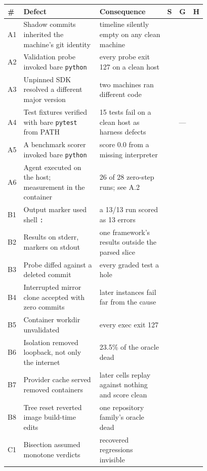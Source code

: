 \documentclass{article}
\newcommand{\cmark}{\ding{51}}
\newcommand{\xmark}{\ding{55}}
\begin{document}
\begin{center}\footnotesize\setlength{\tabcolsep}{4pt}\begin{tabular}{lp{0.42\linewidth}p{0.36\linewidth}ccc}
\toprule
\# & Defect & Consequence & S & G & H \\
\midrule
A1 & Shadow commits inherited the machine's git identity & timeline silently empty on any clean machine & \cmark{} & \cmark{} & \cmark{} \\
A2 & Validation probe invoked bare \texttt{python} & every probe exit 127 on a clean host & \xmark{} & \cmark{} & \cmark{} \\
A3 & Unpinned SDK resolved a different major version & two machines ran different code & \xmark{} & \cmark{} & \cmark{} \\
A4 & Test fixtures verified with bare \texttt{pytest} from PATH & 15 tests fail on a clean host as harness defects & \xmark{} & --- & \cmark{} \\
A5 & A benchmark scorer invoked bare \texttt{python} & score 0.0 from a missing interpreter & \cmark{} & \cmark{} & \cmark{} \\
A6 & Agent executed on the host; measurement in the container & 26 of 28 zero-step runs; see A.2 & \cmark{} & \cmark{} & \cmark{} \\
B1 & Output marker used shell \texttt{:} & a 13/13 run scored as 13 errors & \cmark{} & \cmark{} &  \\
B2 & Results on stderr, markers on stdout & one framework's results outside the parsed slice & \cmark{} & \cmark{} &  \\
B3 & Probe diffed against a deleted commit & every graded test a hole & \cmark{} & \cmark{} &  \\
B4 & Interrupted mirror clone accepted with zero commits & later instances fail far from the cause & \cmark{} & \cmark{} &  \\
B5 & Container workdir unvalidated & every exec exit 127 & \cmark{} & \cmark{} &  \\
B6 & Isolation removed loopback, not only the internet & 23.5\% of the oracle dead & \cmark{} & \cmark{} &  \\
B7 & Provider cache served removed containers & later cells replay against nothing and score clean & \cmark{} & \cmark{} &  \\
B8 & Tree reset reverted image build-time edits & one repository family's oracle dead & \cmark{} & \cmark{} &  \\
C1 & Bisection assumed monotone verdicts & recovered regressions invisible & \cmark{} & \cmark{} &  \\

\end{tabular}
\end{center}
\end{document}
